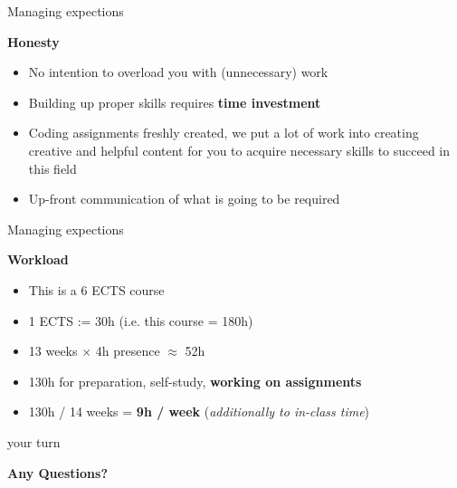 \begin{vbframe}{Managing expections}

\vfill

\textbf{Honesty}

	\begin{itemize}
		\item No intention to overload you with (unnecessary) work
		\item Building up proper skills requires \textbf{time investment}
		\item Coding assignments freshly created, we put a lot of work into creating creative and helpful content for you to acquire necessary skills to succeed in this field
		\item Up-front communication of what is going to be required
	\end{itemize}
\vfill

\end{vbframe}


\begin{vbframe}{Managing expections}

\vfill

\textbf{Workload}

	\begin{itemize}
		\item This is a 6 ECTS course
		\item 1 ECTS := 30h (i.e. this course = 180h)
		\item 13 weeks $\times$ 4h presence $\approx$ 52h
		\item 130h for preparation, self-study, \textbf{working on assignments} 
		\item 130h / 14 weeks = \textbf{9h / week} (\textit{additionally to in-class time})
	\end{itemize}


\vfill

\end{vbframe}


\begin{vbframe}{your turn}

\vfill

\centering \Huge{\bf Any Questions?}

\vfill

\end{vbframe}

